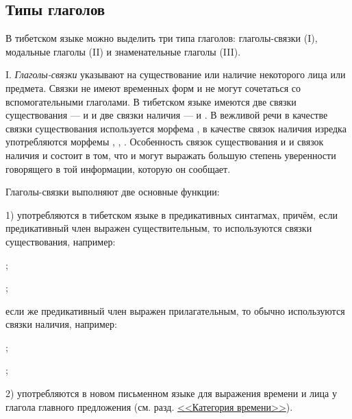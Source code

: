\subsection{Типы глаголов}

В тибетском языке можно выделить три типа глаголов: глаголы-связки (I), модальные глаголы (II) и знаменательные глаголы (III).

I. \emph{Глаголы-связки} указывают на существование или наличие некоторого лица или предмета. Связки не имеют временных форм и не могут сочетаться со вспомогательными глаголами. В тибетском языке имеются две связки существования ---  и  и две связки наличия ---  и . В вежливой речи в качестве связки существования используется морфема , в качестве связок наличия изредка употребляются морфемы , , . Особенность связок существования  и  и связок наличия  и  состоит в том, что  и  могут выражать большую степень уверенности говорящего в той информации, которую он сообщает.

Глаголы-связки выполняют две основные функции:

1) употребляются в тибетском языке в предикативных синтагмах, причём, если предикативный член выражен существительным, то используются связки существования, например:
\begin{prfsample}
	\item {};
	\item {};
\end{prfsample}
если же предикативный член выражен прилагательным, то обычно используются связки наличия, например:
\begin{prfsample}
	\item {};
	\item {};
\end{prfsample}

2) употребляются в новом письменном языке для выражения времени и лица у глагола главного предложения (см. разд. \hyperref[sec:glagol:kat_vremeni]{<<Категория времени>>}).

